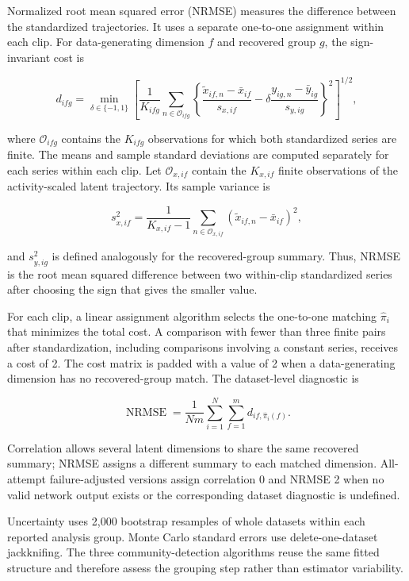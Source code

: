 \documentclass[
]{article}
\begin{document}
Normalized root mean squared error (NRMSE) measures the difference
between the standardized trajectories. It uses a separate one-to-one
assignment within each clip. For data-generating dimension \(f\) and
recovered group \(g\), the sign-invariant cost is

\[
d_{ifg}
=
\min_{\delta\in\{-1,1\}}
\left[
\frac{1}{K_{ifg}}
\sum_{n\in\mathcal O_{ifg}}
\left\{
\frac{\tilde{x}_{if,n}-\bar{x}_{if}}{s_{x,if}}
-\delta
\frac{y_{ig,n}-\bar{y}_{ig}}{s_{y,ig}}
\right\}^{2}
\right]^{1/2},
\]

where \(\mathcal O_{ifg}\) contains the \(K_{ifg}\) observations for
which both standardized series are finite. The means and sample standard
deviations are computed separately for each series within each clip. Let
\(\mathcal O_{x,if}\) contain the \(K_{x,if}\) finite observations of
the activity-scaled latent trajectory. Its sample variance is

\[
s_{x,if}^{2}
=
\frac{1}{K_{x,if}-1}
\sum_{n\in\mathcal O_{x,if}}
\left(\tilde{x}_{if,n}-\bar{x}_{if}\right)^2,
\]

and \(s_{y,ig}^{2}\) is defined analogously for the recovered-group
summary. Thus, NRMSE is the root mean squared difference between two
within-clip standardized series after choosing the sign that gives the
smaller value.

For each clip, a linear assignment algorithm selects the one-to-one
matching \(\widehat\pi_i\) that minimizes the total cost. A comparison
with fewer than three finite pairs after standardization, including
comparisons involving a constant series, receives a cost of 2. The cost
matrix is padded with a value of 2 when a data-generating dimension has
no recovered-group match. The dataset-level diagnostic is

\[
\operatorname{NRMSE}
=
\frac{1}{Nm}
\sum_{i=1}^{N}\sum_{f=1}^{m}
d_{if,\widehat\pi_i(f)}.
\]

Correlation allows several latent dimensions to share the same recovered
summary; NRMSE assigns a different summary to each matched dimension.
All-attempt failure-adjusted versions assign correlation 0 and NRMSE 2
when no valid network output exists or the corresponding dataset
diagnostic is undefined.

Uncertainty uses 2,000 bootstrap resamples of whole datasets within each
reported analysis group. Monte Carlo standard errors use
delete-one-dataset jackknifing. The three community-detection algorithms
reuse the same fitted structure and therefore assess the grouping step
rather than estimator variability.
\end{document}

